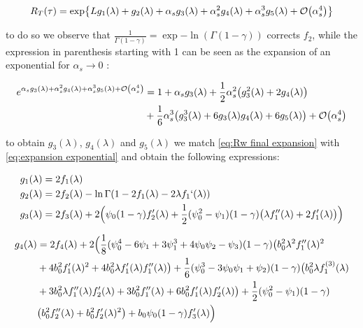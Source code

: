 \documentclass[../main.tex]{subfiles}
\begin{document}
\begin{equation}\label{eq:RT resummed}
    R_T(\tau) = \exp{L g_1(\lambda) + g_2(\lambda) + \alpha_s g_3(\lambda) + \alpha_s^2 g_4(\lambda) + \alpha_s^3 g_5(\lambda) + \order{\alpha_s^4}}
\end{equation}

to do so we observe that $\frac{1}{\Gamma(1-\gamma)}= \exp{-\ln(\Gamma(1-\gamma))}$ corrects $f_2$, while the expression in parenthesis starting with 1 can be seen 
as the expansion of an exponential for $\alpha_s \to 0$ : 

\begin{equation}
    \begin{split}\label{eq:expansion exponential}
    e^{\alpha_s g_3(\lambda) + \alpha_s^2 g_4(\lambda) + \alpha_s^3 g_5(\lambda) + \order{\alpha_s^4}} &= 1+\alpha_s g_3(\lambda)+\frac{1}{2} \alpha_s^2 \qty(g_3^2(\lambda)+2 g_4(\lambda))\\
    &+\frac{1}{6} \alpha_s^3 \qty(g_3^3(\lambda) + 6 g_3(\lambda) g_4(\lambda) + 6 g_5(\lambda))+ \order{\alpha_s^4}
    \end{split}
\end{equation}

to obtain $g_3(\lambda)$, $g_4(\lambda)$ and $g_5(\lambda)$ we match \cref{eq:Rw final expansion} with \cref{eq:expansion exponential} and obtain the following expressions:


\begin{align}
    & g_1(\lambda) = 2 f_1(\lambda) \\
    & g_2(\lambda) = 2 f_2(\lambda) -  \ln \Gamma(1- 2 f_1(\lambda)- 2 \lambda f_1`(\lambda))\\
    & g_3(\lambda) = 2 f_3(\lambda) + 2  \Bigl( \psi_0(1-\gamma) f_2'(\lambda )  + \frac{1}{2} (\psi_0^2-\psi_1)(1-\gamma)\bigl( \lambda  f_1''(\lambda ) +2  f_1'(\lambda )\bigr)\Bigr)
\end{align}

\begin{align}
    \begin{split}
        g_4(\lambda) &= 2 f_4(\lambda) + 2 \Bigl(\frac{1}{8} (\psi_0^4 -6 \psi_1 + 3\psi_1^3 +4\psi_0\psi_2 -\psi_3)(1-\gamma) \bigl(b_0^2 \lambda ^2 f_1''(\lambda )^2\\
        &+4 b_0^2 f_1'(\lambda )^2 +4 b_0^2 \lambda  f_1'(\lambda ) f_1''(\lambda )\bigr)+\frac{1}{6} (\psi_0^3 -3 \psi_0\psi_1+\psi_2)(1-\gamma) \bigl(b_0^2 \lambda  f_1^{(3)}(\lambda )\\
        &+ 3 b_0^2 \lambda  f_1''(\lambda ) f_2'(\lambda )+3 b_0^2 f_1''(\lambda )+6 b_0^2 f_1'(\lambda ) f_2'(\lambda )\bigr)+\frac{1}{2} (\psi_0^2-\psi_1)(1-\gamma)\\
        &\bigl(b_0^2 f_2''(\lambda )+b_0^2 f_2'(\lambda )^2\bigr) + b_0 \psi_0(1-\gamma) f_3'(\lambda )\Bigr)
    \end{split}
\end{align}
\end{document}
